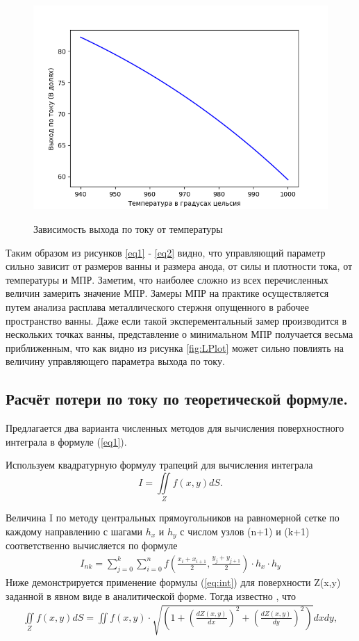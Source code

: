 \documentclass{article}
\begin{document}
\begin{figure}[H]
\centering
\includegraphics[width=0.8\linewidth]{T.png}
\caption{}
\label{fig:TPlot}
Зависимость выхода по току от температуры
\end{figure}

Таким образом из рисунков \ref{eq1} - \ref{eq2} видно, что управляющий параметр сильно зависит от размеров ванны и размера анода, от силы и плотности тока, от температуры и МПР. Заметим, что наиболее сложно из всех перечисленных величин замерить значение МПР. Замеры МПР на практике осуществляется путем анализа расплава металлического стержня опущенного в рабочее пространство ванны. Даже если такой эксперементальный замер производится в нескольких точках ванны, представление о минимальном МПР получается весьма приближенным, что как видно из рисунка \ref{fig:LPlot} может сильно повлиять на величину управляющего параметра выхода по току.

\subsection{Расчёт потери по току по теоретической формуле.}\label{sec:teor}

Предлагается два варианта численных методов для вычисления поверхностного интеграла в формуле (\ref{eq1}).

Используем квадратурную формулу трапеций для вычисления интеграла
\begin{equation} \label{eq:int}
I = \iint\limits_Z f(x,y) dS.
\end{equation}

Величина I по методу центральных прямоугольников на равномерной сетке по каждому направлению с шагами $h_x$ и $h_y$ с числом узлов (n+1) и (k+1) соответственно вычисляется по формуле
\begin{align}\label{eq:squaremethod}
I_{nk} = \sum\limits_{j=0}^{k} \sum\limits_{i=0}^{n} f(\frac{x_i+x_{i+1}}{2},\frac{y_j+y_{j+1}}{2}) \cdot h_x \cdot h_y
\end{align}
Ниже демонстрируется применение формулы (\ref{eq:int}) для поверхности Z(x,y) заданной в явном виде в аналитической форме. Тогда известно \cite{ litlink:Kudryavcev}, что 
\begin{align}
\iint\limits_Z f(x,y) dS = \label{eq:analit}
\iint\limits f(x,y) \cdot \sqrt{(1+(\frac{dZ(x,y)}{dx})^2+ (\frac{dZ(x,y)}{dy})^2)}dxdy,
\end{align}
\end{document}
